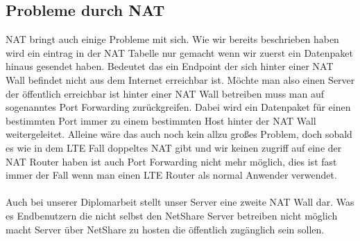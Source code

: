 \subsection{Probleme durch NAT}
NAT bringt auch einige Probleme mit sich. Wie wir bereits beschrieben haben wird ein eintrag in der NAT Tabelle nur gemacht wenn wir zuerst ein Datenpaket hinaus gesendet haben. Bedeutet das ein Endpoint der sich hinter einer NAT Wall befindet nicht aus dem Internet erreichbar ist. Möchte man also einen Server der öffentlich erreichbar ist hinter einer NAT Wall betreiben muss man auf sogenanntes Port Forwarding zurückgreifen. Dabei wird ein Datenpaket für einen bestimmten Port immer zu einem bestimmten Host hinter der NAT Wall weitergeleitet. Alleine wäre das auch noch kein allzu großes Problem, doch sobald es wie in dem LTE Fall doppeltes NAT gibt und wir keinen zugriff auf eine der NAT Router haben ist auch Port Forwarding nicht mehr möglich, dies ist fast immer der Fall wenn man einen LTE Router als normal Anwender verwendet.
\\\\
Auch bei unserer Diplomarbeit stellt unser Server eine zweite NAT Wall dar. Was es Endbenutzern die nicht selbst den NetShare Server betreiben nicht möglich macht Server über NetShare zu hosten die öffentlich zugänglich sein sollen.